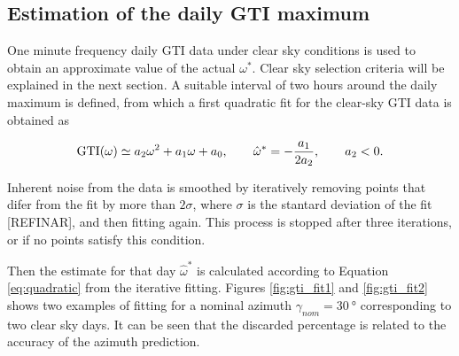 


\subsection{Estimation of the daily GTI maximum}\label{subsec:dailyfit}

One minute frequency daily GTI data under clear sky conditions is used to obtain an approximate value of the actual $\omega^{*}$. Clear sky selection criteria will be explained in the next section. A suitable interval of two hours around the daily maximum is defined, from which a first quadratic fit for the clear-sky GTI data is obtained as

\begin{equation}
  \mathrm{GTI}(\omega)\simeq a_2\omega^2+a_1\omega+a_0,
  \qquad
  \hat\omega^{*}=-\frac{a_1}{2a_2},\qquad a_2<0.
  \label{eq:quadratic}
\end{equation}

Inherent noise from the data is smoothed by iteratively removing points that difer from the fit by more than $2\sigma$, where $\sigma$ is the stantard deviation of the fit [REFINAR], and then fitting again. This process is stopped after three iterations, or if no points satisfy this condition. 

Then the estimate for that day $ \hat\omega^{*}$ is calculated according to Equation \ref{eq:quadratic} from the iterative fitting. Figures \ref{fig:gti_fit1} and \ref{fig:gti_fit2} shows two examples of fitting for a nominal azimuth $\gamma_{nom} = \SI{+30}{\degree}$ corresponding to two clear sky days. It can be seen that the discarded percentage is related to the accuracy of the azimuth prediction.


